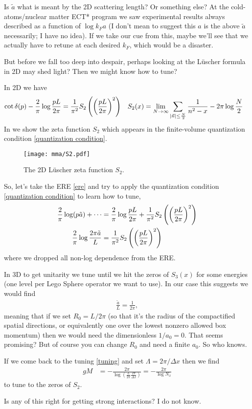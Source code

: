 Is $\tilde{a}$ what is meant by the 2D scattering length?  Or something else?
At the cold-atoms/nuclear matter ECT* program we saw experimental results always described as a function of $\log k_F a$ (I don't mean to suggest this $a$ is the above $\tilde{a}$ necessarily; I have no idea).
If we take our cue from this, maybe we'll see that we actually have to retune at each desired $k_F$, which would be a disaster.

But before we fall too deep into despair, perhaps looking at the L\"{u}scher formula in 2D may shed light?
Then we might know how to tune?

In 2D we have
\begin{align}
	\cot \delta(p) - \frac{2}{\pi} \log \frac{pL}{2\pi} &= \frac{1}{\pi^2} S_2\left(\left(\frac{pL}{2\pi}\right)^2\right)
	&	
	S_2(x) &= \lim_{N\rightarrow\infty} \sum_{\left| \vec{n} \right| \leq \frac{N}{2}} \frac{1}{n^2-x} - 2\pi \log \frac{N}{2}
	\label{eq:quantization condition}
\end{align}
In  we show the zeta function $S_2$ which appears in the finite-volume quantization condition \eqref{quantization condition}.
\begin{figure}
	\texttt{[image: mma/S2.pdf]}
	\caption{The 2D L\"{u}scher zeta function $S_2$.}
	\label{fig:S2}
\end{figure}

So, let's take the ERE \eqref{ere} and try to apply the quantization condition \eqref{quantization condition} to learn how to tune,
\begin{align}
	\frac{2}{\pi} \log(p \tilde{a}) + \cdots
	&=
	\frac{2}{\pi} \log \frac{pL}{2\pi} + \frac{1}{\pi^2} S_2\left(\left(\frac{pL}{2\pi}\right)^2\right)
	\\
	\frac{2}{\pi} \log \frac{2\pi \tilde{a}}{L} &= \frac{1}{\pi^2} S_2\left(\left(\frac{pL}{2\pi}\right)^2\right)
\end{align}
where we dropped all non-log dependence from the ERE.

In 3D to get unitarity we tune until we hit the zeros of $S_3(x)$ for some energies (one level per Lego Sphere operator we want to use).
In our case this suggests we would find
\begin{align}
	\frac{\tilde{a}}{L} = \frac{1}{2\pi},
\end{align}
meaning that if we set $R_0=L/2\pi$ (so that it's the radius of the compactified spatial directions, or equivalently one over the lowest nonzero allowed box momentum) then we would need the dimensionless $1/a_0 = 0$.
That seems promising?
But of course you can change $R_0$ and need a finite $a_0$.
So who knows.

If we come back to the tuning \eqref{tuning} and set $\Lambda=2\pi/\Delta x$ then we find
\begin{align}
	gM &= - \frac{2\pi}{\log\left(\frac{L}{2\pi} \frac{2\pi}{\Delta x}\right)} = -\frac{2\pi}{\log N_x}
\end{align}
to tune to the zeros of $S_2$.

Is any of this right for getting strong interactions?  I do not know.
